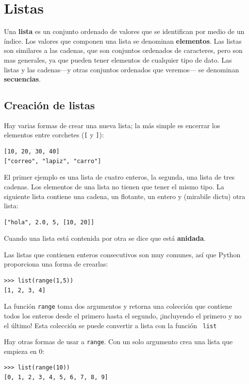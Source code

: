 
\chapter{Listas}

\label{cap:listas}   

Una \textbf{lista} es un conjunto ordenado de valores que se identifican
por medio de un índice. Los valores que componen una lista se denominan
\textbf{elementos}. Las listas son similares a las cadenas, que son
conjuntos ordenados de caracteres, pero son mas generales, ya que
pueden tener elementos de cualquier tipo de dato. Las listas y las
cadenas—y otras conjuntos ordenados que veremos— se denominan \textbf{secuencias}.

\section{Creación de listas}

Hay varias formas de crear una nueva lista; la más simple es encerrar
los elementos entre corchetes (\verb+[+ y \verb+]+):
\begin{verbatim}
[10, 20, 30, 40]
["correo", "lapiz", "carro"]
\end{verbatim}

El primer ejemplo es una lista de cuatro enteros, la segunda, una
lista de tres cadenas. Los elementos de una lista no tienen que tener
el mismo tipo. La siguiente lista contiene una cadena, un flotante,
un entero y (mirabile dictu) otra lista:
\begin{verbatim}
["hola", 2.0, 5, [10, 20]]
\end{verbatim}

Cuando una lista está contenida por otra se dice que está \textbf{anidada}.


Las listas que contienen enteros consecutivos son muy comunes, así
que Python proporciona una forma de crearlas:
\begin{verbatim}
>>> list(range(1,5))
[1, 2, 3, 4]
\end{verbatim}

La función \texttt{range} toma dos argumentos y retorna una colección
que contiene todos los enteros desde el primero hasta el segundo,
¡incluyendo el primero y no el último! Esta colección se puede convertir
a lista con la función  \texttt{ list }

Hay otras formas de usar a \texttt{range}. Con un solo argumento crea
una lista que empieza en 0:
\begin{verbatim}
>>> list(range(10))
[0, 1, 2, 3, 4, 5, 6, 7, 8, 9]
\end{verbatim}

